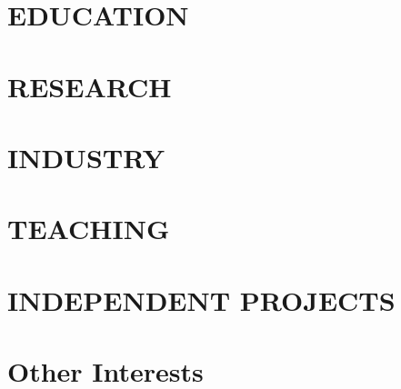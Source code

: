 \documentclass[margin, 10pt]{res} %
\begin{document}
\begin{resume}

\vspace{-1em}
\section{EDUCATION}


\vspace{-1.75em}
\section{RESEARCH}


\section{INDUSTRY}


\section{TEACHING}



\section{INDEPENDENT PROJECTS}


\section{Other Interests}


\end{resume}
\end{document}
